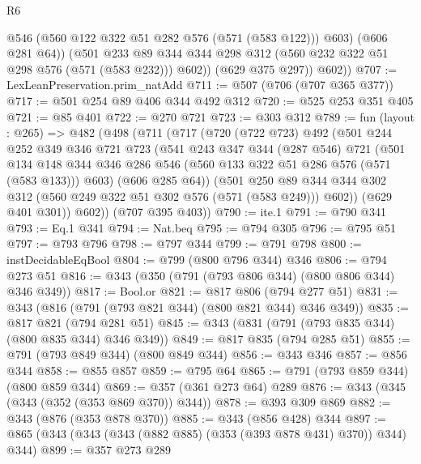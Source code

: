 \begin{lexlean}{R6}
\begin{coremodule}
                @546
                (@560 @122 @322 @51 @282 @576 (@571 (@583 @122)))
                @603)
              (@606 @281 @64))
            (@501
              @233
              @89
              @344
              @344
              @298
              @312
              (@560 @232 @322 @51 @298 @576 (@571 (@583 @232)))
              @602))
          (@629 @375 @297))
        @602))
@707 := LexLeanPreservation.prim_natAdd
@711 := @507 (@706 (@707 @365 @377))
@717 := @501 @254 @89 @406 @344 @492 @312
@720 := @525 @253 @351 @405
@721 := @85 @401
@722 := @270 @721
@723 := @303 @312
@789 := fun (layout : @265) =>
  @482
    (@498
      (@711
        (@717
          (@720
            (@722 @723)
            @492
            (@501
              @244
              @252
              @349
              @346
              @721
              @723
              (@541
                @243
                @347
                @344
                (@287 @546)
                @721
                (@501
                  @134
                  @148
                  @344
                  @346
                  @286
                  @546
                  (@560 @133 @322 @51 @286 @576 (@571 (@583 @133)))
                  @603)
                (@606 @285 @64))
              (@501
                @250
                @89
                @344
                @344
                @302
                @312
                (@560 @249 @322 @51 @302 @576 (@571 (@583 @249)))
                @602))
            (@629 @401 @301))
          @602))
      (@707 @395 @403))
@790 := ite.{1}
@791 := @790 @341
@793 := Eq.{1} @341
@794 := Nat.beq
@795 := @794 @305
@796 := @795 @51
@797 := @793 @796
@798 := @797 @344
@799 := @791 @798
@800 := instDecidableEqBool
@804 := @799 (@800 @796 @344) @346
@806 := @794 @273 @51
@816 := @343 (@350 (@791 (@793 @806 @344) (@800 @806 @344) @346 @349))
@817 := Bool.or
@821 := @817 @806 (@794 @277 @51)
@831 := @343 (@816 (@791 (@793 @821 @344) (@800 @821 @344) @346 @349))
@835 := @817 @821 (@794 @281 @51)
@845 := @343 (@831 (@791 (@793 @835 @344) (@800 @835 @344) @346 @349))
@849 := @817 @835 (@794 @285 @51)
@855 := @791 (@793 @849 @344) (@800 @849 @344)
@856 := @343 @346
@857 := @856 @344
@858 := @855 @857
@859 := @795 @64
@865 := @791 (@793 @859 @344) (@800 @859 @344)
@869 := @357 (@361 @273 @64) @289
@876 := @343 (@345 (@343 (@352 (@353 @869 @370)) @344))
@878 := @393 @309 @869
@882 := @343 (@876 (@353 @878 @370))
@885 := @343 (@856 @428) @344
@897 := @865 (@343 (@343 (@343 (@882 @885) (@353 (@393 @878 @431) @370)) @344) @344)
@899 := @357 @273 @289

\end{coremodule}
\end{lexlean}

